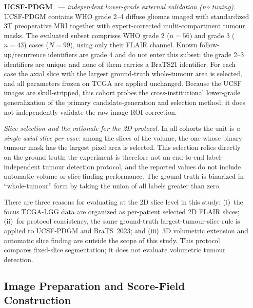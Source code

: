 \documentclass[11pt,a4paper]{article}
\begin{document}
\textbf{UCSF-PDGM}~\cite{calabrese2022,ucsfpdgmV5} --- \emph{independent
lower-grade external validation (no tuning)}. UCSF-PDGM contains WHO grade 2--4
diffuse gliomas imaged with standardized 3T preoperative MRI together with
expert-corrected multi-compartment tumour masks. The evaluated subset comprises
WHO grade 2 ($n{=}56$) and grade 3 ($n{=}43$)
cases ($N{=}99$), using only their FLAIR channel.
Known follow-up/recurrence identifiers are grade 4 and do not enter this subset;
the grade 2--3 identifiers are unique and none of them carries a BraTS21
identifier. For each case the axial slice with the largest ground-truth
whole-tumour area is selected, and all parameters frozen on TCGA are applied
unchanged. Because the UCSF images are skull-stripped, this cohort probes the
cross-institutional lower-grade generalization of the primary candidate-generation
and selection method; it does not independently validate the raw-image
ROI correction.

\emph{Slice selection and the rationale for the 2D protocol.} In all cohorts the
unit is \emph{a single axial slice per case}: among the slices of the volume, the
one whose binary tumour mask has the largest pixel area is selected. This
selection relies directly on the ground truth; the experiment is therefore not an
end-to-end label-independent tumour detection protocol, and the reported values do
not include automatic volume or slice finding performance. The ground truth is
binarized in ``whole-tumour'' form by taking the union of all labels greater than
zero.

There are three reasons for evaluating at the 2D slice level in this study:
(i)~the focus TCGA-LGG data are organized as per-patient selected 2D FLAIR
slices; (ii)~for protocol consistency, the same ground-truth largest-tumour-slice
rule is applied to UCSF-PDGM and BraTS~2023; and (iii)~3D volumetric extension
and automatic slice finding are outside the scope of this study. This protocol
compares fixed-slice segmentation; it does not evaluate volumetric tumour
detection.

\subsection{Image Preparation and Score-Field Construction}\label{sec:overview}
\end{document}
